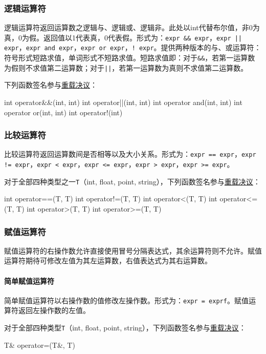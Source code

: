 \documentclass[UTF8]{ctexart}
\begin{document}
\subsubsection{逻辑运算符}
\label{luoji}

逻辑运算符返回运算数之逻辑与、逻辑或、逻辑非。此处以int代替布尔值，非0为真，0为假。返回值以1代表真，0代表假。形式为：\verb|expr && expr|，\verb&expr || expr&，\verb|expr and expr|，\verb&expr or expr&，\verb|! expr|。提供两种版本的与、或运算符：符号形式短路求值，单词形式不短路求值。短路求值即：对于\verb|&&|，若第一运算数为假则不求值第二运算数；对于\verb&||&，若第一运算数为真则不求值第二运算数。

下列函数签名参与\hyperref[chongzai]{重载决议}：
\begin{MUAvbt}
int operator&&(int, int)
int operator||(int, int)
int operator and(int, int)
int operator or(int, int)
int operator!(int)
\end{MUAvbt}

\subsubsection{比较运算符}
\label{bijiao}

比较运算符返回运算数间是否相等以及大小关系。形式为：\verb|expr == expr|，\verb|expr != expr|，\verb|expr < expr|，\verb|expr <= expr|，\verb|expr > expr|，\verb|expr >= expr|。

对于全部四种类型之一\verb|T|（int, float, point, string），下列函数签名参与\hyperref[chongzai]{重载决议}：
\begin{MUAvbt}
int operator==(T, T)
int operator!=(T, T)
int operator<(T, T)
int operator<=(T, T)
int operator>(T, T)
int operator>=(T, T)
\end{MUAvbt}

\subsubsection{赋值运算符}
\label{fuzhi}

赋值运算符的右操作数允许直接使用冒号分隔表达式，其余运算符则不允许。赋值运算符期待可修改左值为其左运算数，右值表达式为其右运算数。

\paragraph{简单赋值运算符} 简单赋值运算符以右操作数的值修改左操作数。形式为：\verb|expr = exprf|。赋值运算符返回左操作数的左值。

对于全部四种类型\verb|T|（int, float, point, string），下列函数签名参与\hyperref[chongzai]{重载决议}：
\begin{MUAvbt}
T& operator=(T&, T)
\end{MUAvbt}
\end{document}
